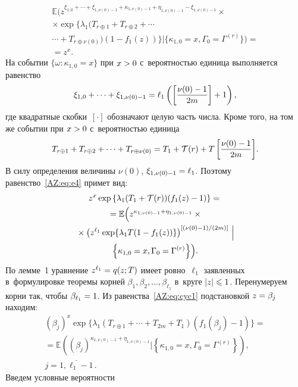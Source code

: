 \begin{multicols}{2}
  \noindent
  \begin{multline}
    \mathbb{E}\biggl(
    z^{\xi_{1,0}+\cdots+\xi_{1,\nu(0)-1}+%
      \kappa_{1,\nu(0)-1}+\eta_{1,\nu(0)-1}-\xi_{1,\nu(0)-1}}\times
    \\ \times
    \exp\{\lambda_{1}(T_{r\oplus1}+T_{r\oplus2}+\cdots{}\\
    {}\cdots +T_{r\oplus\nu(0)})
    (1-f_{1}(z))\}\Big|\{\kappa_{1,0}=x,\Gamma_{0}=\Gamma^{(r)}\}\biggr)={}\\
    {}=z^x.
    \label{AZ:eq:e4}
\end{multline}
На событии $\{\omega\colon \kappa_{1,0}=x\}$ при
$x\hm>0$ с~вероятностью единица выполняется равенство
\begin{equation*}
  \xi_{1,0}+\cdots+\xi_{1,\nu(0)-1}=
  \ell_1\left(\left[\displaystyle\frac{\displaystyle \nu(0)-1\mathstrut}{\displaystyle 2m\mathstrut}\right]+1\right),
\end{equation*}
где квадратные скобки~$[\cdot]$ обозначают целую часть числа.  Кроме того, на
том же событии при $x\hm>0$ с~вероятностью единица
\begin{equation*}
T_{r\oplus1}+T_{r\oplus2}+\cdots+T_{r\oplus\nu(0)}=
T_1+ \mathcal T(r) +T\left[\displaystyle\frac{\displaystyle \nu(0)-1\mathstrut}{\displaystyle 2m\mathstrut}\right]\!.
\end{equation*}
В силу определения величины $\nu(0)$, $\xi_{1,\nu(0)-1}\hm=\ell_1$. Поэтому
равенство~\eqref{AZ:eq:e4} примет вид:
\begin{multline}
  z^{x}\exp\left\{\lambda_{1}(T_{1}+\mathcal{T}(r))(f_{1}(z)-1)\right\}={}  \\
  {} =
  \mathbb{E}\Bigl( z^{\kappa_{1,\nu(0)-1}+\eta_{1,\nu(0)-1}}\times{}\\
  {}\times 
  \left( z^{\ell_1}\exp\{ \lambda_{1}T(1-f_{1}(z))\}
  \right)^{\left[ (\nu(0)-1)/(2m)\right]}\,\Big|\\
  \left\{\kappa_{1,0}=x,\Gamma_{0}=\Gamma^{(r)}\right\}\Bigr).
  \label{AZ:eq:cyc1}
\end{multline}
По лемме~1 уравнение $z^{\ell_1}\hm=q(z;T)$ имеет ровно~$\ell_1$
заявленных в~формулировке теоремы корней $\beta_1, \beta_2, \ldots,
\beta_{\ell_1}$  в~круге $|z|\hm\leqslant1$. Перенумеруем корни так, чтобы
$\beta_{\ell_1}\hm=1$. Из равенства~\eqref{AZ:eq:cyc1} подстановкой $z\hm=\beta_j$
находим:
\begin{multline}
  \label{AZ:eq:bet}
  (\beta_{j})^{x}\exp\{\lambda_{1}(T_{r\oplus1}+\cdots+T_{2m}+T_{1}) %
  (f_{1}(\beta_{j})-1)\}={}  \\ 
  {}=
  \mathbb{E}\left((\beta_{j})^{\kappa_{1,\nu(0)-1}+\eta_{1,\nu(0)-1}}\Big|
 \left \{\kappa_{1,0}=x,\Gamma_{0}=\Gamma^{(r)}\right\}\right),\\
  j=\overline{1,\ell_1-1}\,.
\end{multline}
Введем условные вероятности


\end{multicols}
